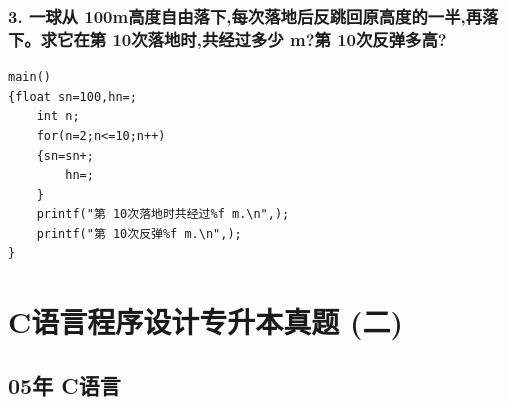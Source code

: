 \documentclass[12pt,a4paper]{article}
\begin{document}
\subsubsection*{3. 一球从 100m高度自由落下,每次落地后反跳回原高度的一半,再落下。求它在第 10次落地时,共经过多少 m?第 10次反弹多高?}
\begin{verbatim}
main()
{float sn=100,hn=;
    int n;
    for(n=2;n<=10;n++)
    {sn=sn+;
        hn=;
    }
    printf("第 10次落地时共经过%f m.\n",);
    printf("第 10次反弹%f m.\n",);
}
\end{verbatim}

\section{C语言程序设计专升本真题 (二)}

\subsection*{05年 C语言}
\end{document}
